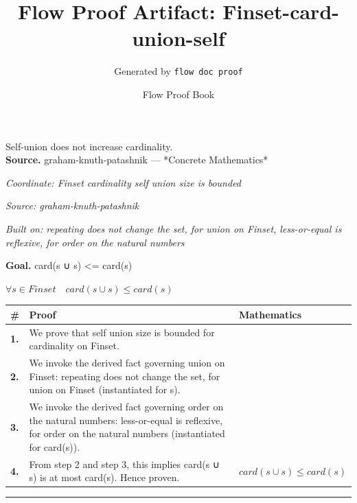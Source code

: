 \documentclass[11pt]{article}
\title{Flow Proof Artifact: Finset-card-union-self}
\author{Generated by \texttt{flow doc proof}}
\date{Flow Proof Book}
\theoremstyle{definition}
\begin{document}
\maketitle
Self-union does not increase cardinality.\\[0.5em]
\textbf{Source.} graham-knuth-patashnik — *Concrete Mathematics*\\[0.5em]
\bigskip
{}\par
\smallskip\noindent\textit{Coordinate: Finset \cdot cardinality \cdot self union size is bounded}\par
\smallskip\noindent\textit{Source: graham-knuth-patashnik}\par
\smallskip\noindent\textit{Built on: repeating does not change the set, for union on Finset, less-or-equal is reflexive, for order on the natural numbers}\par
\medskip
\noindent\textbf{Goal.} card(s ∪ s) <= card(s)\par
\noindent$\displaystyle \forall s \in Finset\quad card(s ∪ s) \le card(s)$\par
\medskip
\noindent
\begin{tabular}{@{} >{\raggedright\arraybackslash}p{} >{\raggedright\arraybackslash}p{} >{\raggedleft\arraybackslash}p{} @{}}
\textbf{\#} & \textbf{Proof} & \textbf{Mathematics} \\
\midrule
\textbf{1.} & We prove that self union size is bounded for cardinality on Finset. & \\[0.45em]
\textbf{2.} & We invoke the derived fact governing union on Finset: repeating does not change the set, for union on Finset (instantiated for s). & \\[0.45em]
\textbf{3.} & We invoke the derived fact governing order on the natural numbers: less-or-equal is reflexive, for order on the natural numbers (instantiated for card(s)). & \\[0.45em]
\textbf{4.} & From step 2 and step 3, this implies card(s ∪ s) is at most card(s). Hence proven. & $\displaystyle card(s ∪ s) \le card(s)$ \\[0.45em]
\bottomrule
\end{tabular}
\label{thm:Finset-cardinality-self_union_size_is_bounded}
\par\medskip\hrule
\end{document}
